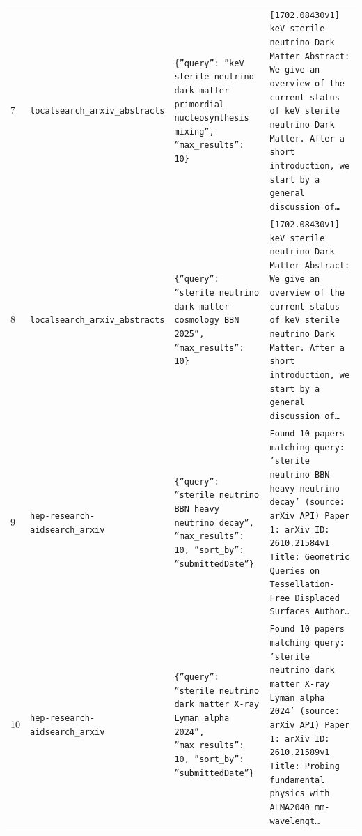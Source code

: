 \documentclass[11pt,a4paper]{article}
\begin{document}
\begin{longtable}{@{}p{}p{}p{}p{}@{}}
7 & \texttt{local}\newline\texttt{search\_\allowbreak{}arxiv\_\allowbreak{}abstracts} & \texttt{\{''query'':\allowbreak{} ''keV sterile neutrino dark matter primordial nucleosynthesis mixing'',\allowbreak{} ''max\_\allowbreak{}results'':\allowbreak{} 10\}\allowbreak{}} & \texttt{[1702.08430v1]\allowbreak{} keV sterile neutrino Dark Matter Abstract:\allowbreak{} We give an overview of the current status of keV sterile neutrino Dark Matter. After a short introduction,\allowbreak{} we start by a general discussion of\ldots{}\allowbreak{}} \\
8 & \texttt{local}\newline\texttt{search\_\allowbreak{}arxiv\_\allowbreak{}abstracts} & \texttt{\{''query'':\allowbreak{} ''sterile neutrino dark matter cosmology BBN 2025'',\allowbreak{} ''max\_\allowbreak{}results'':\allowbreak{} 10\}\allowbreak{}} & \texttt{[1702.08430v1]\allowbreak{} keV sterile neutrino Dark Matter Abstract:\allowbreak{} We give an overview of the current status of keV sterile neutrino Dark Matter. After a short introduction,\allowbreak{} we start by a general discussion of\ldots{}\allowbreak{}} \\
9 & \texttt{hep-research-aid}\newline\texttt{search\_\allowbreak{}arxiv} & \texttt{\{''query'':\allowbreak{} ''sterile neutrino BBN heavy neutrino decay'',\allowbreak{} ''max\_\allowbreak{}results'':\allowbreak{} 10,\allowbreak{} ''sort\_\allowbreak{}by'':\allowbreak{} ''submittedDate''\}\allowbreak{}} & \texttt{Found 10 papers matching query:\allowbreak{} 'sterile neutrino BBN heavy neutrino decay' (source:\allowbreak{} arXiv API)\allowbreak{}  Paper 1:\allowbreak{} arXiv ID:\allowbreak{} 2610.21584v1 Title:\allowbreak{} Geometric Queries on Tessellation-Free Displaced Surfaces Author\ldots{}\allowbreak{}} \\
10 & \texttt{hep-research-aid}\newline\texttt{search\_\allowbreak{}arxiv} & \texttt{\{''query'':\allowbreak{} ''sterile neutrino dark matter X-ray Lyman alpha 2024'',\allowbreak{} ''max\_\allowbreak{}results'':\allowbreak{} 10,\allowbreak{} ''sort\_\allowbreak{}by'':\allowbreak{} ''submittedDate''\}\allowbreak{}} & \texttt{Found 10 papers matching query:\allowbreak{} 'sterile neutrino dark matter X-ray Lyman alpha 2024' (source:\allowbreak{} arXiv API)\allowbreak{}  Paper 1:\allowbreak{} arXiv ID:\allowbreak{} 2610.21589v1 Title:\allowbreak{} Probing fundamental physics with ALMA2040 mm-wavelengt\ldots{}\allowbreak{}} \\

\end{longtable}
\end{document}
